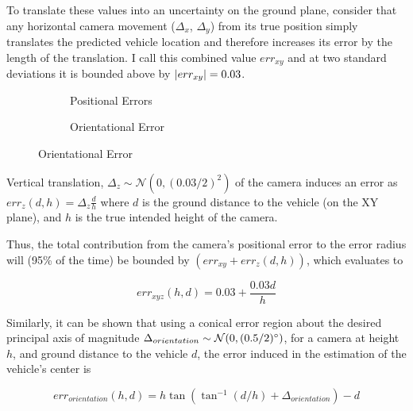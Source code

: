 \documentclass[a4paper,12pt,twoside,openright]{report}
\begin{document}


To translate these values into an uncertainty on the ground plane, consider that
any horizontal camera movement ($\Delta_{x}$, $\Delta_{y}$) from its true position simply translates
the predicted vehicle location and therefore increases its error by the length of the translation.
I call this combined value $err_{xy}$ and at two standard deviations it is bounded above by
$\abs{err_{xy}} = 0.03$.

\begin{figure}[htb]
\centering
\begin{subfigure}[b]{.45\textwidth}
  \centering
  \resizebox{\linewidth}{!}{} 
  \caption{Positional Errors}
  \label{fig:camera:xyz error}
\end{subfigure}%
\begin{subfigure}[b]{.45\textwidth}
  \centering
  \resizebox{\linewidth}{!}{}
  \caption{Orientational Error}
  \label{fig:camera:orient error}
\end{subfigure}
\label{fig:camera:errors}
\end{figure}
Vertical translation, $\Delta_z\sim \mathcal{N}(0, (0.03/2)^2)$
of the camera induces an error as $err_{z}(d, h) = \Delta_z \frac{d}{h}$ %
where $d$ is the ground distance to the vehicle (on the XY plane), and $h$ is the true intended
height of the camera.

Thus, the total contribution from the camera's positional error to the error radius
will (95\% of the time) be bounded by $(err_{xy} + err_{z}(d, h))$, which evaluates to

\[ err_{xyz}(h, d) = 0.03 + \frac{0.03d}{h} \]

Similarly, it can be shown that using a conical error region about the desired principal axis
of magnitude $\Delta_{orientation} \sim \mathcal{N}(0,(0.5/2)\degree)$, 
for a camera at height $h$, and ground distance to the vehicle $d$, the
error induced in the estimation of the vehicle's center is 

\[ err_{orientation}(h, d) = h\tan(\tan^{-1}(d/h) + \Delta_{orientation}) - d \] %
\end{document}
